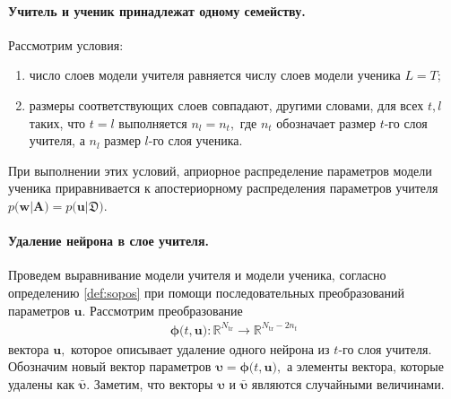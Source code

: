 \paragraph{Учитель и ученик принадлежат одному семейству.}
\label{section:one:space}
Рассмотрим условия:
\begin{enumerate}[1)]
    \item число слоев модели учителя равняется числу слоев модели ученика $L=T$;
    \item размеры соответствующих слоев совпадают, другими словами, для всех $t, l$ таких, что $t=l$ выполняется $n_l = n_t,$ где $n_t$ обозначает размер $t$-го слоя учителя, а $n_l$ размер $l$-го слоя ученика.
\end{enumerate}
При выполнении этих условий, априорное распределение параметров модели ученика приравнивается к апостериорному распределения параметров учителя $p\bigr(\mathbf{w}|\mathbf{A}\bigr) = p\bigr(\mathbf{u}|\mathfrak{D}\bigr)$.

\paragraph{Удаление нейрона в слое учителя.}
Проведем выравнивание модели учителя и модели ученика, согласно определению \ref{def:sopos} при помощи последовательных преобразований параметров $\mathbf{u}$. Рассмотрим преобразование
\[
\label{ch:3:eq:ap:2}
\begin{aligned}
\bm{\phi}\bigr(t, \mathbf{u}\bigr) : \mathbb{R}^{N_{\text{tr}}} \to \mathbb{R}^{N_{\text{tr}}-2n_t}
\end{aligned}
\]
вектора $\mathbf{u},$ которое описывает удаление одного нейрона из $t$-го слоя учителя.
Обозначим новый вектор параметров $\bm{\upsilon} =  \bm{\phi}\bigr(t, \mathbf{u}\bigr),$ а элементы вектора, которые удалены как $\bar{\bm{\upsilon}}.$ Заметим, что векторы $\bm{\upsilon}$ и $\bar{\bm{\upsilon}}$ являются случайными величинами. 

